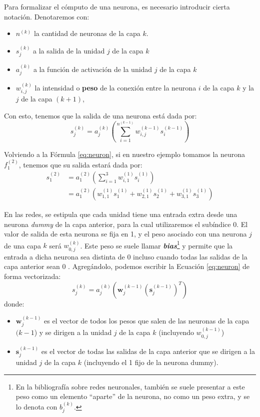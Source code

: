 \documentclass[../../main.tex]{subfiles}
\begin{document}
Para formalizar el cómputo de una neurona, es necesario introducir cierta notación.
Denotaremos con:
\begin{itemize}[itemsep=0.1cm]
    \item \(n^{(k)}\) la cantidad de neuronas de la capa \(k\).
    \item \(s^{(k)}_j\) a la salida de la unidad \(j\) de la capa \(k\)
    \item \(a^{(k)}_j\) a la función de activación de la unidad \(j\) de la capa \(k\)
    \item \(w^{(k)}_{i,j}\) la intensidad o \textbf{peso} de la conexión entre la
    neurona \(i\) de la capa \(k\) y la \(j\) de la capa \((k+1)\),
\end{itemize}
Con esto, tenemos que la salida de una neurona está dada por:
\begin{equation}
    s^{(k)}_j = a^{(k)}_j \left( \sum_{i=1}^{n^{(k-1)}} w^{(k-1)}_{i,j} s^{(k-1)}_i \right)
    \label{eq:neuron}
\end{equation}

Volviendo a la Fórmula \ref{eq:neuron}, si en nuestro ejemplo tomamos la neurona
\(f^{(2)}_1\), tenemos que su salida estará dada por:
\begin{align*}
    s^{(2)}_1 &= a^{(2)}_1 \left( \sum_{i=1}^{3} w^{(1)}_{i,1} s^{(1)}_i \right) \\
              &= a^{(2)}_1 \left( w^{(1)}_{1,1}s^{(1)}_1 +  w^{(1)}_{2,1}s^{(1)}_2 + w^{(1)}_{3,1}s^{(1)}_3 \right)
\end{align*}

En las redes, se estipula que cada unidad tiene una entrada extra desde una neurona
\textit{dummy} de la capa anterior, para la cual utilizaremos el subíndice 0. El valor de
salida de esta neurona se fija en 1, y el peso asociado con una neurona \(j\) de una capa
\(k\) será \(w^{(k)}_{0,j}\). Este peso se suele llamar \textit{\textbf{bias}}\footnote{En
la bibliografía sobre redes neuronales, también se suele presentar a este peso como un
elemento ``aparte'' de la neurona, no como un peso extra, y se lo denota con
\(b^{(k)}_j\).} y permite que la entrada a dicha neurona sea distinta de 0 incluso cuando
todas las salidas de la capa anterior sean 0 \cite{ai-a-modern-approach}. Agregándolo,
podemos escribir la Ecuación \ref{eq:neuron} de forma vectorizada:
\begin{equation}
    s^{(k)}_j = a^{(k)}_j \left( \bm{w}^{(k-1)}_j \left( \bm{s}^{(k-1)}_j \right)^T \right)
\end{equation}
donde: \vspace{-0.25cm}
\begin{itemize}
    \item \(\bm{w}^{(k-1)}_j\) es el vector de todos los pesos que salen de las neuronas de la
    capa \((k-1\)) y se dirigen a la unidad \(j\) de la capa \(k\) (incluyendo \(w^{(k-1)}_{0,j}\))
    \item \(\bm{s}^{(k-1)}_j\) es el vector de todas las salidas de la capa anterior que se
dirigen a la unidad \(j\) de la capa \(k\) (incluyendo el 1 fijo de la neurona dummy).
\end{itemize}
\end{document}
